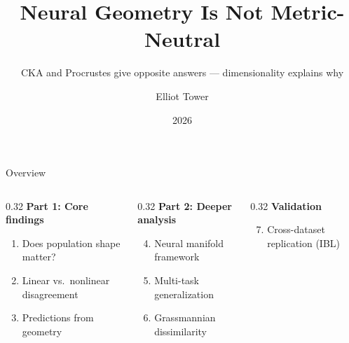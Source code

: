\documentclass[aspectratio=169,11pt]{beamer}
\title{Neural Geometry Is Not Metric-Neutral}
\subtitle{CKA and Procrustes give opposite answers --- dimensionality explains why}
\author{Elliot Tower}
\date{2026}
\institute{}
\begin{document}
\maketitle

\begin{frame}{Overview}

\begin{columns}[T]
\begin{column}{0.32\textwidth}
\textbf{Part 1: Core findings}
{\small
\begin{enumerate}
  \item Does population shape matter?
  \item Linear vs.\ nonlinear disagreement
  \item Predictions from geometry
\end{enumerate}
}
\end{column}
\begin{column}{0.32\textwidth}
\textbf{Part 2: Deeper analysis}
{\small
\begin{enumerate}
  \setcounter{enumi}{3}
  \item Neural manifold framework
  \item Multi-task generalization
  \item Grassmannian dissimilarity
\end{enumerate}
}
\end{column}
\begin{column}{0.32\textwidth}
\textbf{Validation}
{\small
\begin{enumerate}
  \setcounter{enumi}{6}
  \item Cross-dataset replication (IBL)
\end{enumerate}
}
\end{column}
\end{columns}
\end{frame}
\end{document}
